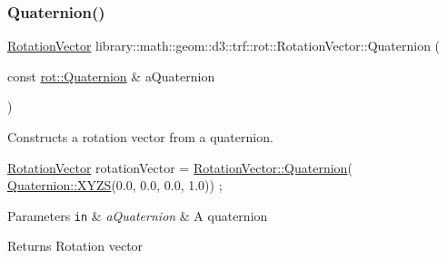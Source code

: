 \subsubsection{\texorpdfstring{Quaternion()}{Quaternion()}}
{\footnotesize\ttfamily \hyperlink{classlibrary_1_1math_1_1geom_1_1d3_1_1trf_1_1rot_1_1_rotation_vector}{Rotation\+Vector} library\+::math\+::geom\+::d3\+::trf\+::rot\+::\+Rotation\+Vector\+::\+Quaternion (\begin{DoxyParamCaption}\item[{const \hyperlink{classlibrary_1_1math_1_1geom_1_1d3_1_1trf_1_1rot_1_1_quaternion}{rot\+::\+Quaternion} \&}]{a\+Quaternion }\end{DoxyParamCaption})\hspace{0.3cm}{\ttfamily [static]}}



Constructs a rotation vector from a quaternion. 


\begin{DoxyCode}
\hyperlink{classlibrary_1_1math_1_1geom_1_1d3_1_1trf_1_1rot_1_1_rotation_vector_a49076a279f457fdb14c4a9d4d61e1738}{RotationVector} rotationVector = \hyperlink{classlibrary_1_1math_1_1geom_1_1d3_1_1trf_1_1rot_1_1_rotation_vector_a6da4ed18679e28816896de413e04ed79}{RotationVector::Quaternion}(
      \hyperlink{classlibrary_1_1math_1_1geom_1_1d3_1_1trf_1_1rot_1_1_quaternion_a006294eb483bcfc352c2dc36cf19ceec}{Quaternion::XYZS}(0.0, 0.0, 0.0, 1.0)) ;
\end{DoxyCode}



\begin{DoxyParams}[1]{Parameters}
\mbox{\tt in}  & {\em a\+Quaternion} & A quaternion \\
\hline
\end{DoxyParams}
\begin{DoxyReturn}{Returns}
Rotation vector 
\end{DoxyReturn}
\mbox{\label{classlibrary_1_1math_1_1geom_1_1d3_1_1trf_1_1rot_1_1_rotation_vector_a397807ffe12bb72cd788660b83bdf7b3}} 
